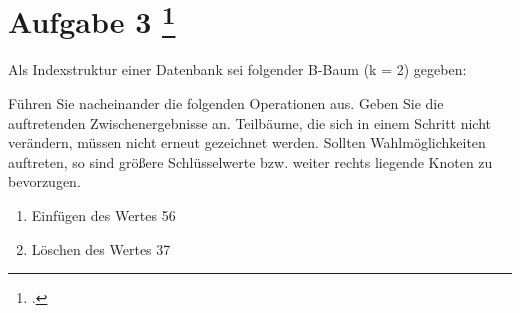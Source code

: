 \documentclass{lehramt-informatik-aufgabe}
\begin{document}
\section{Aufgabe 3
\footcite{66116:2015:03}}

Als Indexstruktur einer Datenbank sei folgender B-Baum (k = 2) gegeben:

Führen Sie nacheinander die folgenden Operationen aus. Geben Sie die
auftretenden Zwischenergebnisse an. Teilbäume, die sich in einem Schritt
nicht verändern, müssen nicht erneut gezeichnet werden. Sollten
Wahlmöglichkeiten auftreten, so sind größere Schlüsselwerte bzw. weiter
rechts liegende Knoten zu bevorzugen.

\begin{enumerate}


\item Einfügen des Wertes 56


\item Löschen des Wertes 37
\end{enumerate}
\end{document}
